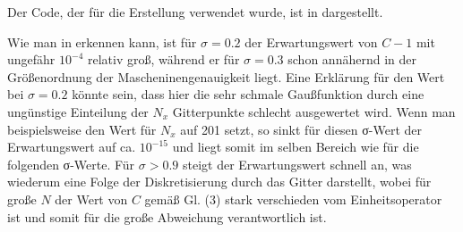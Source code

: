 Der Code, der für die Erstellung verwendet wurde, ist in  dargestellt.


Wie man in  erkennen kann, ist für $σ=0.2$ der Erwartungswert von $C-1$ mit ungefähr $10^{-4}$
relativ groß, während er für $σ=0.3$ schon annähernd in der Größenordnung der Mascheninengenauigkeit liegt.
Eine Erklärung für den Wert bei $σ=0.2$ könnte sein, dass hier die sehr schmale Gaußfunktion durch eine ungünstige 
Einteilung der $N_x$ Gitterpunkte schlecht ausgewertet wird. Wenn man beispielsweise den Wert für $N_x$ auf 201 
setzt, so sinkt für diesen σ-Wert der Erwartungswert auf ca. $10^{-15}$ und liegt somit im selben Bereich wie für die 
folgenden σ-Werte. Für $σ>0.9$ steigt der Erwartungswert schnell an, was wiederum eine Folge der Diskretisierung 
durch das Gitter darstellt, wobei für große $N$ der Wert von $C$ gemäß Gl. (3) stark verschieden vom Einheitsoperator
ist und somit für die große Abweichung verantwortlich ist.
